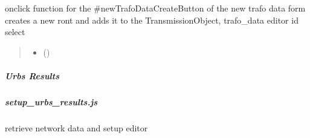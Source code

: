 \documentclass[letterpaper,10pt,english]{sphinxmanual}
\begin{document}

\begin{fulllineitems}
\label{\detokenize{docs_gui/js_api/urbs_editor/transmission_editor:createNewTrafoData}}
\pysigstartsignatures
{}
\pysigstopsignatures
\sphinxAtStartPar
onclick function for the \#newTrafoDataCreateButton of the new trafo data form
creates a new ront and adds it to the TransmissionObject, trafo\_data editor id select
\begin{quote}\begin{description}
\begin{itemize}
\item {} 
\sphinxAtStartPar
{} () \textendash{} 

\end{itemize}

\end{description}\end{quote}

\end{fulllineitems}


\sphinxstepscope


\subparagraph{Urbs Results}
\label{\detokenize{docs_gui/js_api/urbs_results/index:urbs-results}}\label{\detokenize{docs_gui/js_api/urbs_results/index::doc}}
\sphinxstepscope


\subparagraph{setup\_urbs\_results.js}
\label{\detokenize{docs_gui/js_api/urbs_results/setup_urbs_results:setup-urbs-results-js}}\label{\detokenize{docs_gui/js_api/urbs_results/setup_urbs_results::doc}}

\begin{fulllineitems}
\label{\detokenize{docs_gui/js_api/urbs_results/setup_urbs_results:SetupUrbsResultEditor}}
\pysigstartsignatures
{}
\pysigstopsignatures
\sphinxAtStartPar
retrieve network data and setup editor

\end{fulllineitems}
\end{document}
